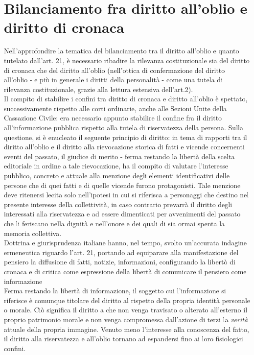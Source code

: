 \section{Bilanciamento fra diritto all'oblio e diritto di cronaca}
Nell'approfondire la tematica del bilanciamento tra il diritto all'oblio e quanto tutelato dall'art. 21, è necessario ribadire la rilevanza costituzionale sia del diritto di cronaca che del diritto all'oblio (nell'ottica di confermazione del diritto all'oblio - e più in generale i diritti della personalità - come una tutela di rilevanza costituzionale, grazie alla lettura estensiva dell'art.2).
\\Il compito di stabilire i confini tra diritto di cronaca e diritto all'oblio è spettato, successivamente rispetto alle corti ordinarie, anche alle Sezioni Unite della Cassazione Civile: era necessario appunto stabilire il confine fra il diritto all'informazione pubblica rispetto alla tutela di riservatezza della persona.
Sulla questione, si è enucleato il seguente principio di diritto: in tema di rapporti  tra il diritto all'oblio e il diritto alla rievocazione storica di fatti e vicende concernenti eventi del passato, il giudice di merito - ferma restando la libertà della scelta editoriale in ordine a tale rievocazione, ha il compito di valutare l'interesse pubblico, concreto e attuale alla menzione degli elementi identificativi delle persone che di quei fatti e di quelle vicende furono protagonisti.
Tale menzione deve ritenersi lecita solo nell'ipotesi in cui si riferisca a personaggi che destino nel presente interesse della collettività, in caso contrario prevarrà il diritto degli interessati alla riservatezza e ad essere dimenticati per avvenimenti del passato che li feriscano nella dignità e nell'onore e dei quali di sia ormai spenta la memoria collettiva.
\\Dottrina e giurisprudenza italiane hanno, nel tempo, svolto un'accurata indagine ermeneutica riguardo l'art. 21, portando ad equiparare alla manifestazione del pensiero la diffusione di fatti, notizie, informazioni, configurando la libertò di cronaca e di critica come espressione della libertà di comunicare il pensiero come informazione
\\Ferma restando la libertà di informazione, il soggetto cui l'informazione si riferisce è comunque titolare del diritto al rispetto della propria identità personale o morale. Ciò significa il diritto a che non venga travisato o alterato all'esterno il proprio patrimonio morale e non venga compromessa dall'azione di terzi la \textit{verità} attuale della propria immagine.
Venuto meno l'interesse alla conoscenza del fatto, il diritto alla riservatezza e all'oblio tornano ad espandersi fino ai loro fisiologici confini.

